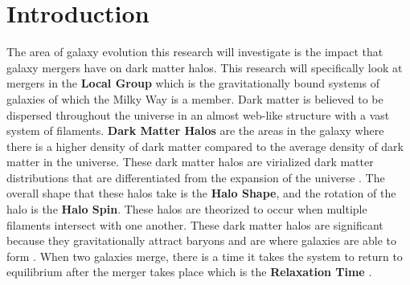 \documentclass[linenumbers,trackchanges,twocolumn]{aastex7}
\begin{document}

\section{Introduction} 
The area of galaxy evolution this research will investigate is the impact that galaxy mergers have on dark matter halos. This research will specifically look at mergers in the \textbf{Local Group} which is the gravitationally bound systems of galaxies of which the Milky Way is a member. Dark matter is believed to be dispersed throughout the universe in an almost web-like structure with a vast system of filaments. \textbf{Dark Matter Halos} are the areas in the galaxy where there is a higher density of dark matter compared to the average density of dark matter in the universe. These dark matter halos are virialized dark matter distributions that are differentiated from the expansion of the universe \cite{Willman_Strader_2012}. The overall shape that these halos take is the \textbf{Halo Shape}, and the rotation of the halo is the \textbf{Halo Spin}. These halos are theorized to occur when multiple filaments intersect with one another. These dark matter halos are significant because they gravitationally attract baryons and are where galaxies are able to form \cite{Frenk_2012}. When two galaxies merge, there is a time it takes the system to return to equilibrium after the merger takes place which is the \textbf{Relaxation Time} \cite{2004MNRAS.349.1039N}. 
\end{document}
